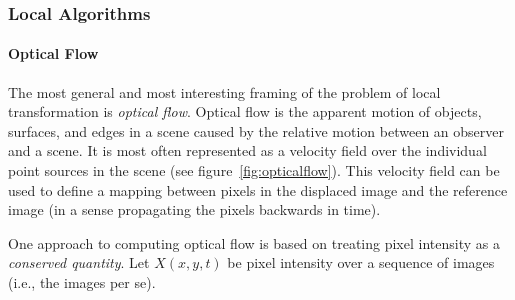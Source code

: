 \subsubsection{Local Algorithms}
\paragraph{Optical Flow}

The most general and most interesting framing of the problem of local transformation is \textit{optical flow}.
%
Optical flow is the apparent motion of objects, surfaces, and edges in a scene caused by the relative motion between an observer and a scene.
%
It is most often represented as a velocity field over the individual point sources in the scene (see figure~\ref{fig:opticalflow}).
%
This velocity field can be used to define a mapping between pixels in the displaced image and the reference image (in a sense propagating the pixels backwards in time).

One approach to computing optical flow is based on treating pixel intensity as a \textit{conserved quantity}.
%
Let \(X(x,y,t)\) be pixel intensity over a sequence of images (i.e., the images per se).
%

